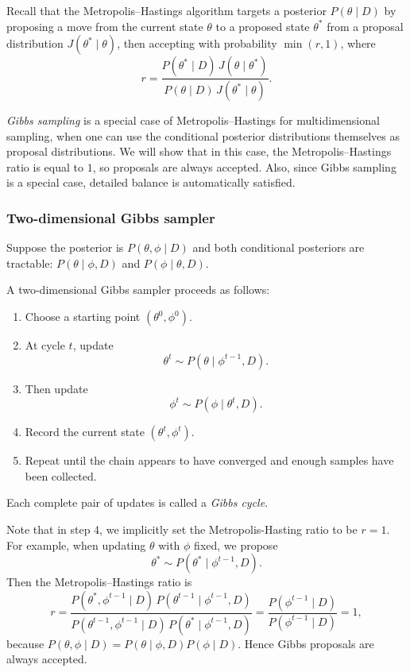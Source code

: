 \documentclass[11pt, titlepage]{article} %
\numberwithin{equation}{section}
\theoremstyle{definition}
\numberwithin{assumption}{section}
\begin{document}
Recall that the Metropolis--Hastings algorithm targets a posterior
$P(\theta\mid D)$ by proposing a move from the current state $\theta$ to a proposed state $\theta^*$ from a proposal distribution $J(\theta^*\mid \theta)$, then accepting with probability $\min(r,1)$, where
\begin{equation*}
    r
    =
    \frac{P(\theta^*\mid D)\,J(\theta\mid \theta^*)}
         {P(\theta\mid D)\,J(\theta^*\mid \theta)}.
\end{equation*}

\textit{Gibbs sampling} is a special case of Metropolis--Hastings for multidimensional sampling, when one can use the conditional posterior distributions themselves as proposal distributions. We will show that in this case, the Metropolis--Hastings ratio is equal to $1$, so proposals are always accepted. Also, since Gibbs sampling is a special case, detailed balance is automatically satisfied. 



\subsubsection*{Two-dimensional Gibbs sampler}

Suppose the posterior is $P(\theta,\phi\mid D)$ and both conditional posteriors are tractable:
$P(\theta\mid \phi,D)$ and $P(\phi\mid \theta,D)$.

A two-dimensional Gibbs sampler proceeds as follows:
\begin{enumerate}
    \item Choose a starting point $(\theta^0,\phi^0)$.
    \item At cycle $t$, update
    \begin{equation*}
        \theta^t \sim P(\theta\mid \phi^{t-1},D).
    \end{equation*}
    \item Then update
    \begin{equation*}
        \phi^t \sim P(\phi\mid \theta^t,D).
    \end{equation*}
    \item Record the current state $(\theta^t,\phi^t)$.
    \item Repeat until the chain appears to have converged and enough samples have been collected.
\end{enumerate}
Each complete pair of updates is called a \textit{Gibbs cycle}.

Note that in step 4, we implicitly set the Metropolis-Hasting ratio to be $r=1$. For example, when updating $\theta$ with $\phi$ fixed, we propose
\begin{equation*}
    \theta^* \sim P(\theta^*\mid \phi^{t-1},D).
\end{equation*}
Then the Metropolis--Hastings ratio is
\begin{equation*}
    r=
    \frac{P(\theta^*,\phi^{t-1}\mid D)\,P(\theta^{t-1}\mid \phi^{t-1},D)}
         {P(\theta^{t-1},\phi^{t-1}\mid D)\,P(\theta^*\mid \phi^{t-1},D)}
    =\frac{P(\phi^{t-1}\mid D)}{P(\phi^{t-1}\mid D)}
    =1,
\end{equation*}
because $P(\theta,\phi\mid D)=P(\theta\mid \phi,D)P(\phi\mid D)$. Hence Gibbs proposals are always accepted.
\end{document}

